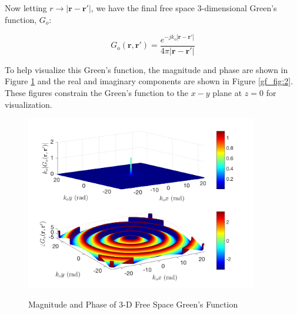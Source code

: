 \noindent Now letting $r \rightarrow |\mathbf{r}-\mathbf{r}'|$, we have the final free space 3-dimensional Green's function, $G_o$:

\begin{equation}
\boxed{G_o\left(\mathbf{r},\mathbf{r}'\right) = \frac{e^{-jk_o|\mathbf{r} - \mathbf{r}'|}}{4\pi |\mathbf{r} - \mathbf{r}'|}}
\label{gf_eq:26}
\end{equation}
\renewcommand{\baselinestretch}{2} \small\normalsize

To help visualize this Green's function, the magnitude and phase are shown in Figure \ref{gf_fig:1} and the real and imaginary components are shown in Figure \ref{gf_fig:2}. These figures constrain the Green's function to the $x-y$ plane at $z=0$ for visualization.

\begin{figure}[ht]
\centering
\includegraphics[width=4in]{../media/3d_fs_gf_mag.png}
\renewcommand{\baselinestretch}{1}
\small\normalsize
\begin{quote}
\caption[Magnitude and Phase of 3-D Free Space Green's Function]{ Magnitude and Phase of 3-D Free Space Green's Function\label{gf_fig:1}}
\end{quote}
\end{figure} 
\renewcommand{\baselinestretch}{2}
\small\normalsize

